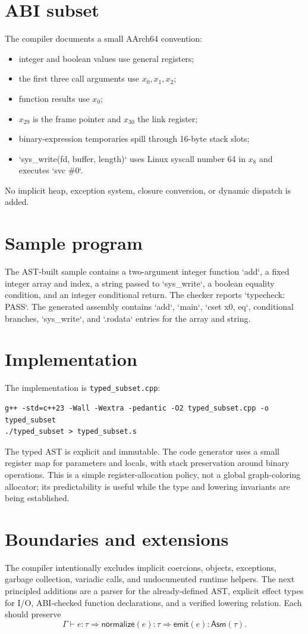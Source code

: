 \documentclass[11pt,a4paper]{article}
\begin{document}
\section{ABI subset}
The compiler documents a small AArch64 convention:
\begin{itemize}
\item integer and boolean values use general registers;
\item the first three call arguments use $x_0,x_1,x_2$;
\item function results use $x_0$;
\item $x_{29}$ is the frame pointer and $x_{30}$ the link register;
\item binary-expression temporaries spill through 16-byte stack slots;
\item `sys\_write(fd, buffer, length)` uses Linux syscall number 64 in $x_8$ and executes `svc \#0`.
\end{itemize}
No implicit heap, exception system, closure conversion, or dynamic dispatch is added.

\section{Sample program}
The AST-built sample contains a two-argument integer function `add`, a fixed integer array and index, a string passed to `sys\_write`, a boolean equality condition, and an integer conditional return. The checker reports `typecheck: PASS`. The generated assembly contains `add`, `main`, `cset x0, eq`, conditional branches, `sys\_write`, and `.rodata` entries for the array and string.

\section{Implementation}
The implementation is \texttt{typed\_subset.cpp}:
\begin{verbatim}
g++ -std=c++23 -Wall -Wextra -pedantic -O2 typed_subset.cpp -o typed_subset
./typed_subset > typed_subset.s
\end{verbatim}
The typed AST is explicit and immutable. The code generator uses a small register map for parameters and locals, with stack preservation around binary operations. This is a simple register-allocation policy, not a global graph-coloring allocator; its predictability is useful while the type and lowering invariants are being established.

\section{Boundaries and extensions}
The compiler intentionally excludes implicit coercions, objects, exceptions, garbage collection, variadic calls, and undocumented runtime helpers. The next principled additions are a parser for the already-defined AST, explicit effect types for I/O, ABI-checked function declarations, and a verified lowering relation. Each should preserve
\[
\Gamma\vdash e:\tau
\Longrightarrow
\mathsf{normalize}(e):\tau
\Longrightarrow
\mathsf{emit}(e):\mathsf{Asm}(\tau).
\]
\end{document}
